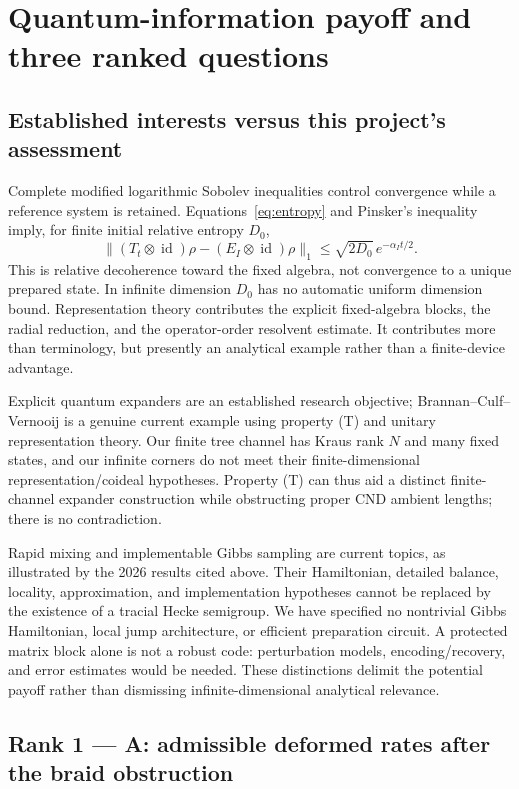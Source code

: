 \documentclass[11pt]{article}
\theoremstyle{remark}\newtheorem{remark}[definition]{Remark}
\newcommand{\id}{\operatorname{id}}
\begin{document}
\section{Quantum-information payoff and three ranked questions}
\subsection{Established interests versus this project's assessment}
Complete modified logarithmic Sobolev inequalities control convergence
while a reference system is retained. Equations~\eqref{eq:entropy} and
Pinsker's inequality imply, for finite initial relative entropy $D_0$,
\[
 \|(T_t\otimes\id)\rho-(E_I\otimes\id)\rho\|_1
 \leq\sqrt{2D_0}\,e^{-\alpha_I t/2}.
\]
This is relative decoherence toward the fixed algebra, not convergence to
a unique prepared state. In infinite dimension $D_0$ has no automatic
uniform dimension bound. Representation theory contributes the explicit
fixed-algebra blocks, the radial reduction, and the operator-order
resolvent estimate. It contributes more than terminology, but presently
an analytical example rather than a finite-device advantage.

Explicit quantum expanders are an established research objective;
Brannan--Culf--Vernooij is a genuine current example using property (T)
and unitary representation theory. Our finite tree channel has Kraus rank
$N$ and many fixed states, and our infinite corners do not meet their
finite-dimensional representation/coideal hypotheses. Property (T) can
thus aid a distinct finite-channel expander construction while obstructing
proper CND ambient lengths; there is no contradiction.

Rapid mixing and implementable Gibbs sampling are current topics, as
illustrated by the 2026 results cited above. Their Hamiltonian, detailed
balance, locality, approximation, and implementation hypotheses cannot be
replaced by the existence of a tracial Hecke semigroup. We have specified
no nontrivial Gibbs Hamiltonian, local jump architecture, or efficient
preparation circuit. A protected matrix block alone is not a robust code:
perturbation models, encoding/recovery, and error estimates would be needed.
These distinctions delimit the potential payoff rather than dismissing
infinite-dimensional analytical relevance.

\subsection{Rank 1 --- A: admissible deformed rates after the braid obstruction}
\end{document}
